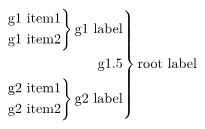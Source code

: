 \documentclass[12pt]{standalone}
\begin{document}
\[ 
\begin{rcases}\begin{alignedat}{3}
  \begin{rcases}
      \begin{alignedat}{3}
	\text{g1 item1} \\[-1.5ex]
	\\[-2ex] %
	\text{g1 item2}
	\end{alignedat}
      \end{rcases}
  \text{g1 label}\\
  \text{g1.5} \\
    \begin{rcases}
      \begin{alignedat}{3}
	\text{g2 item1} \\[-1.5ex]
	\\[-2ex]
	\text{g2 item2}
	\end{alignedat}
      \end{rcases}
    \text{g2 label}
  \end{alignedat}\end{rcases}
\text{root label}
\]
\end{document}
